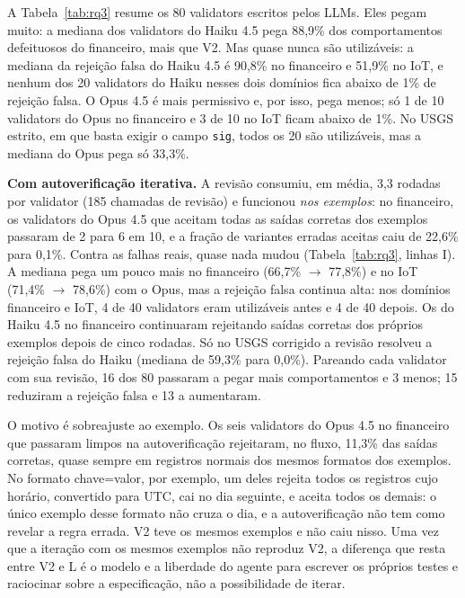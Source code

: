 \documentclass[sigconf,nonacm]{acmart}
\begin{document}
A Tabela~\ref{tab:rq3} resume os 80 validators escritos pelos LLMs. Eles pegam muito: a mediana dos validators do Haiku 4.5 pega 88,9\% dos comportamentos defeituosos do financeiro, mais que V2. Mas quase nunca são utilizáveis: a mediana da rejeição falsa do Haiku 4.5 é 90,8\% no financeiro e 51,9\% no IoT, e nenhum dos 20 validators do Haiku nesses dois domínios fica abaixo de 1\% de rejeição falsa. O Opus 4.5 é mais permissivo e, por isso, pega menos; só 1 de 10 validators do Opus no financeiro e 3 de 10 no IoT ficam abaixo de 1\%. No USGS estrito, em que basta exigir o campo \texttt{sig}, todos os 20 são utilizáveis, mas a mediana do Opus pega só 33,3\%.

\textbf{Com autoverificação iterativa.} A revisão consumiu, em média, 3,3 rodadas por validator (185 chamadas de revisão) e funcionou \textit{nos exemplos}: no financeiro, os validators do Opus 4.5 que aceitam todas as saídas corretas dos exemplos passaram de 2 para 6 em 10, e a fração de variantes erradas aceitas caiu de 22,6\% para 0,1\%. Contra as falhas reais, quase nada mudou (Tabela~\ref{tab:rq3}, linhas I). A mediana pega um pouco mais no financeiro (66,7\% $\to$ 77,8\%) e no IoT (71,4\% $\to$ 78,6\%) com o Opus, mas a rejeição falsa continua alta: nos domínios financeiro e IoT, 4 de 40 validators eram utilizáveis antes e 4 de 40 depois. Os do Haiku 4.5 no financeiro continuaram rejeitando saídas corretas dos próprios exemplos depois de cinco rodadas. Só no USGS corrigido a revisão resolveu a rejeição falsa do Haiku (mediana de 59,3\% para 0,0\%). Pareando cada validator com sua revisão, 16 dos 80 passaram a pegar mais comportamentos e 3 menos; 15 reduziram a rejeição falsa e 13 a aumentaram.

O motivo é sobreajuste ao exemplo. Os seis validators do Opus 4.5 no financeiro que passaram limpos na autoverificação rejeitaram, no fluxo, 11,3\% das saídas corretas, quase sempre em registros normais dos mesmos formatos dos exemplos. No formato chave=valor, por exemplo, um deles rejeita todos os registros cujo horário, convertido para UTC, cai no dia seguinte, e aceita todos os demais: o único exemplo desse formato não cruza o dia, e a autoverificação não tem como revelar a regra errada. V2 teve os mesmos exemplos e não caiu nisso. Uma vez que a iteração com os mesmos exemplos não reproduz V2, a diferença que resta entre V2 e L é o modelo e a liberdade do agente para escrever os próprios testes e raciocinar sobre a especificação, não a possibilidade de iterar.
\end{document}
